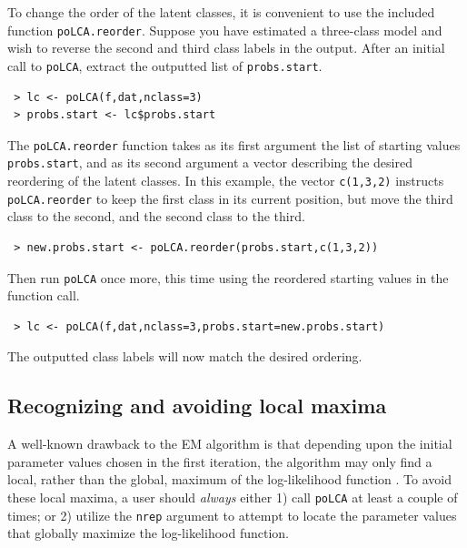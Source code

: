 \documentclass[letterpaper,12pt]{article}
\begin{document}
To change the order of the latent classes, it is convenient to use the included function \texttt{poLCA.reorder}. Suppose you have estimated a three-class model and wish to reverse the second and third class labels in the output.  After an initial call to \texttt{poLCA}, extract the outputted list of \texttt{probs.start}.
\begin{verbatim}
 > lc <- poLCA(f,dat,nclass=3)
 > probs.start <- lc$probs.start
\end{verbatim}
The \texttt{poLCA.reorder} function takes as its first argument the list of starting values \texttt{probs.start}, and as its second argument a vector describing the desired reordering of the latent classes.  In this example, the vector \texttt{c(1,3,2)} instructs \texttt{poLCA.reorder} to keep the first class in its current position, but move the third class to the second, and the second class to the third.
\begin{verbatim}
 > new.probs.start <- poLCA.reorder(probs.start,c(1,3,2))
\end{verbatim}
Then run \texttt{poLCA} once more, this time using the reordered starting values in the function call.
\begin{verbatim}
 > lc <- poLCA(f,dat,nclass=3,probs.start=new.probs.start)
\end{verbatim}
The outputted class labels will now match the desired ordering.

\subsection{Recognizing and avoiding local maxima} \label{s.llmaxima}

A well-known drawback to the EM algorithm is that depending upon the initial parameter values chosen in the first iteration, the algorithm may only find a local, rather than the global, maximum of the log-likelihood function \citep{McLachlanKrishnan1997}.  To avoid these local maxima, a user should \emph{always} either 1) call \texttt{poLCA} at least a couple of times; or 2) utilize the \texttt{nrep} argument to attempt to locate the parameter values that globally maximize the log-likelihood function.
\end{document}

